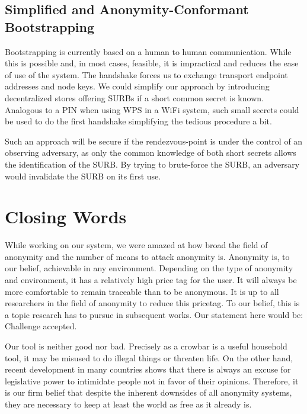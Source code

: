 \section{Simplified and Anonymity-Conformant Bootstrapping}
Bootstrapping is currently based on a human to human communication. While this is possible and, in most cases, feasible, it is impractical and reduces the ease of use of the system. The handshake forces us to exchange transport endpoint addresses and node keys. We could simplify our approach by introducing decentralized stores offering SURBs if a short common secret is known. Analogous to a PIN when using WPS in a WiFi system, such small secrets could be used to do the first handshake simplifying the tedious procedure a bit.

Such an approach will be secure if the rendezvous-point is under the control of an observing adversary, as only the common knowledge of both short secrets allows the identification of the SURB. By trying to brute-force the SURB, an adversary would invalidate the SURB on its first use.

\chapter{Closing Words}
While working on our system, we were amazed at how broad the field of anonymity and the number of means to attack anonymity is. Anonymity is, to our belief, achievable in any environment. Depending on the type of anonymity and environment, it has a relatively high price tag for the user. It will always be more comfortable to remain traceable than to be anonymous. It is up to all researchers in the field of anonymity to reduce this pricetag. To our belief, this is a topic research has to pursue in subsequent works. Our statement here would be: Challenge accepted.

Our tool is neither good nor bad. Precisely as a crowbar is a useful household tool, it may be misused to do illegal things or threaten life. On the other hand, recent development in many countries shows that there is always an excuse for legislative power to intimidate people not in favor of their opinions. Therefore, it is our firm belief that despite the inherent downsides of all anonymity systems, they are necessary to keep at least the world as free as it already is.